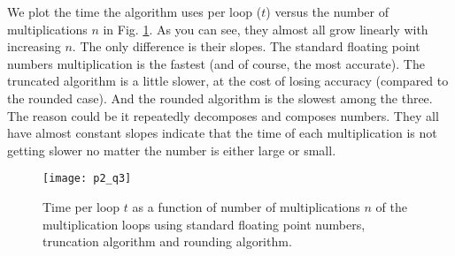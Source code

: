\Answer We plot the time the algorithm uses per loop ($t$) versus the number of
multiplications $n$ in Fig. \ref{fig:time_loop}. As you can see,
they almost all grow linearly with increasing $n$. The only difference is their slopes.
The standard floating point numbers multiplication is the fastest (and of course, the most
accurate). The truncated algorithm is a little slower, at the cost of losing
accuracy (compared to the rounded case). And the rounded algorithm is the slowest
among the three. The reason could be it repeatedly decomposes and composes numbers.
They all have almost constant slopes indicate that the time of each multiplication
is not getting slower no matter the number is either large or small.

\begin{figure}[H]
    \centering
    \texttt{[image: p2\_q3]}
    \caption{Time per loop $t$ as a function of number of multiplications $n$ of
        the multiplication loops using standard floating point numbers,
        truncation algorithm and rounding algorithm.}
    \label{fig:time_loop}
\end{figure}

\newpage
